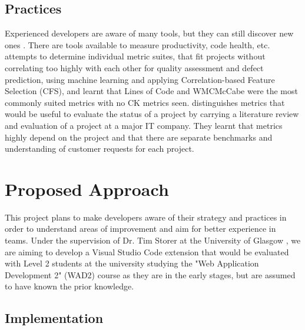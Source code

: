 \documentclass{mprop}
\begin{document}
\subsection{Practices}

Experienced developers are aware of many tools, but they can still discover new ones \cite{murphy2011peer,murphy-hillHowUsersDiscover2015}. There are tools available to measure productivity, code health, etc. \textcite{lajiosSoftwareMetricsSuites2009} attempts to determine individual metric suites, that fit projects without correlating too highly with each other for quality assessment and defect prediction, using machine learning and applying Correlation-based Feature Selection (CFS), and learnt that Lines of Code and WMCMcCabe were the most commonly suited metrics with no CK metrics seen. \textcite{blondeauSoftwareMetricsPredict2015} distinguishes metrics that would be useful to evaluate the status of a project by carrying a literature review and evaluation of a project at a major IT company. They learnt that metrics highly depend on the project and that there are separate benchmarks and understanding of customer requests for each project.

\newpage
\section{Proposed Approach}


This project plans to make developers aware of their strategy and practices in order to understand areas of improvement and aim for better experience in teams. Under the supervision of Dr. Tim Storer \cite{TimStorer} at the University of Glasgow \cite{UniversityGlasgowScottish}, we are aiming to develop a Visual Studio Code \cite{VisualStudioCode} extension that would be evaluated with Level 2 students at the university studying the "Web Application Development 2" \cite{UniversityGlasgowCourse} (WAD2) course as they are in the early stages, but are assumed to have known the prior knowledge.

\subsection{Implementation}
\end{document}
